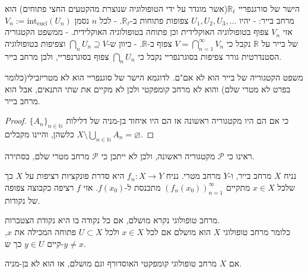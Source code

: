 \documentclass{tstextbook}
\begin{document}
\begin{example}
הישר של סורגנפריי \(\mathbb{R}_{\ell}\)(אשר מוגדר על ידי הטופולוגיה שנוצרת מהקטעים החצי פתוחים) הוא מרחב בייר:
- יהיו \(U_{1},U_{2},U_{3},\dots\) צפופות פתוחות ב-\(\mathbb{R}_{\ell}\).
- לכל \(n\) נסמן \(V_{n}:= \mathrm{int}_{\text{eucl}}(U_{n})\) אזי \(V_{n}\) צפוף בטופולוגיה האוקלידית וכן פתוחה בטופולוגיה האוקלידית. 
- ממשפט הקטגוריה של בייר על \(\mathbb{R}\) נקבל כי \(V=\bigcap_{n=1}^{\infty}V_{n}\) צפוף ב-\(\mathbb{R}\). 
- כיוון ש-\(\bigcap_{n}U_{n}\supseteq V\) וצפיפות בטופולוגיה הסטנדרטית גורר צפיפות בסוגרנפריי נקבל כי \(\bigcap_{n}U_{n}\) צפוף בסוגרנפריי, ולכן מרחב בייר.

\end{example}
\begin{corollary}
משפט הקטגוריה של בייר הוא לא אם"ם. לדוגמא הישר של סוגנפריי הוא לא מטריזבילי(כלומר בפרט לא מטרי שלם) והוא לא מרחב קומפקטי ולכן לא מקיים את שתי התנאים, אבל הוא מרחב בייר.

\end{corollary}
\begin{proof}
כי אם הם היו מקטגוריה ראשונה אז הם היו איחוד בן-מניה של דלילות \(\{A_{n}\}_{n\in\mathbb{N}}\) כלשהן, והיינו מקבלים \(X\setminus\bigcup_{n\in\mathbb{N}}A_{n}=\varnothing\).

\end{proof}
\begin{example}
ראינו כי \(\mathcal{P}\) מקטגוריה ראשונה, ולכן לא ייתכן כי \(\mathcal{P}\) מרחב מטרי שלם, בסתירה.

\end{example}
\begin{example}
נניח \(X\) מרחב בייר, ו-\(Y\) מרחב מטרי. נניח \(f_{n}:X\to Y\) היא סדרת פונקציות רציפות על \(X\) כך שלכל \(x \in X\) מתקיים \((f_{n}(x_{0}))_{n=1}^{\infty}\) מתכנסת ל-\(f(x_{0})\). אזי \(f\) רציפה כקבוצה צפופה של נקודות.

\end{example}
\begin{definition}
מרחב טופולוגי נקרא מושלם, אם כל נקודה בו היא נקודת הצטברות.\\

כלומר מרחב טופולוגי \(X\) הוא מושלם אם לכל \(x\in X\) ולכל \(U\subset X\) פתוחה המכילה את \(x\), קיים \(y\in U\) כך ש-\(y\ne x\).  

\end{definition}
\begin{corollary}
אם \(X\) מרחב טופולוגי קומפקטי האוסדורף וגם מושלם, אז הוא לא בן-מניה.

\end{corollary}
\end{document}
